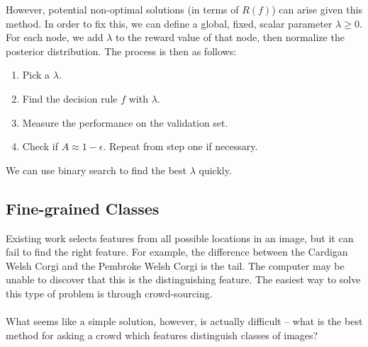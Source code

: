 \documentclass[11pt]{article}
\begin{document}
However, potential non-optimal solutions (in terms of $R(f)$) can arise given this method. In order to fix this, we can define a global, fixed, scalar parameter $\lambda \ge 0$. For each node, we add $\lambda$ to the reward value of that node, then normalize the posterior distribution. The process is then as follows:
\begin{enumerate}
\item Pick a $\lambda$.
\item Find the decision rule $f$ with $\lambda$.
\item Measure the performance on the validation set.
\item Check if $A \approx 1 - \epsilon$. Repeat from step one if necessary. 
\end{enumerate}
We can use binary search to find the best $\lambda$ quickly.\\
\subsection{Fine-grained Classes}
Existing work selects features from all possible locations in an image, but it can fail to find the right feature. For example, the difference between the Cardigan Welsh Corgi and the Pembroke Welsh Corgi is the tail. The computer may be unable to discover that this is the distinguishing feature. The easiest way to solve this type of problem is through crowd-sourcing. \\ \\
What seems like a simple solution, however, is actually difficult -- what is the best method for asking a crowd which features distinguish classes of images? \\
\end{document}
